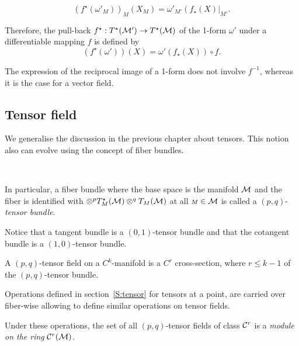 \begin{equation}
\left(f^{\star}(\omega'_{\scriptstyle M})\right)_{\scriptstyle M}(X_{\scriptstyle M})=\omega'_{\scriptstyle M'}\left(f_{\star}(X)\right |_{\scriptstyle M'}.
\end{equation}

Therefore, the pull-back $f^\star:  T^{\star}(\mathcal{M}') \to T^{\star}(\mathcal{M})$ of the 1-form $\omega'$ under a differentiable mapping $f$ is defined by
\begin{equation}
\left(f^{\star}(\omega')\right)(X)=\omega'\left(f_{\star}(X)\right)\circ f.
\end{equation}

\begin{remark}
The expression of the reciprocal image of a 1-form does not involve $f^{-1}$, whereas it is the case for a vector field.
\end{remark}

\subsection{Tensor field} We generalise the discussion in the previous chapter about tensors. This notion also can evolve using the concept of fiber bundles. 

\, 

In particular, a fiber bundle where the base space is the manifold $\mathcal{M}$ and the fiber is identified with $\otimes^{p}T^{\star}_{\scriptstyle M}(\mathcal{M})\otimes^{q}T_{\scriptstyle M}(\mathcal{M})$  at all ${\scriptstyle M}\in \mathcal{M}$ is called a $(p,q)$-\emph{tensor bundle}.

Notice that a tangent bundle is a $(0,1)$-tensor bundle and that the cotangent bundle is a $(1,0)$-tensor bundle.

\begin{definition}
A $(p,q)$-tensor field on a $C^{k}$-manifold is a $C^{r}$ cross-section, where $r\leq k-1$ of the $(p,q)$-tensor bundle.
\end{definition}

Operations defined in section~\ref{S:tensor} for tensors at a point, are carried over fiber-wise allowing to define similar operations on tensor fields. 

Under these operations, the set of all  $(p,q)$-tensor fields of class  $\mathcal{C}^{r}$ is a \emph{ module on the ring} $\mathcal{C}^{r}(\mathcal{M})$.




